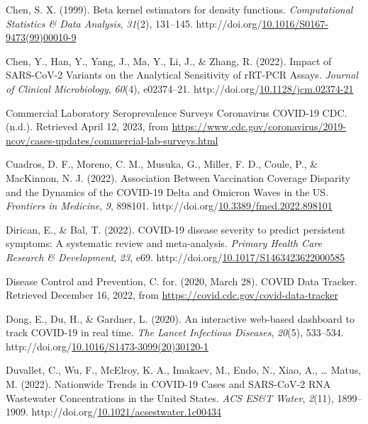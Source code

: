 \documentclass[12pt,twoside]{smiththesis}
\newlength{\cslhangindent}
\newenvironment{CSLReferences}[2] %
 {%
\setlength{\parindent}{0pt}
\ifodd #1 \everypar{\setlength{\hangindent}{\cslhangindent}}\ignorespaces\fi
\ifnum #2 > 0
\setlength{\parskip}{#2\baselineskip}
  \fi
}%
{}
\begin{document}
\begin{CSLReferences}{1}{0}
\leavevmode{}%
Chen, S. X. (1999). Beta kernel estimators for density functions. \emph{Computational Statistics \& Data Analysis}, \emph{31}(2), 131--145. http://doi.org/\href{https://doi.org/10.1016/S0167-9473(99)00010-9}{10.1016/S0167-9473(99)00010-9}

\leavevmode{}%
Chen, Y., Han, Y., Yang, J., Ma, Y., Li, J., \& Zhang, R. (2022). Impact of {SARS-CoV-2 Variants} on the {Analytical Sensitivity} of {rRT-PCR Assays}. \emph{Journal of Clinical Microbiology}, \emph{60}(4), e02374--21. http://doi.org/\href{https://doi.org/10.1128/jcm.02374-21}{10.1128/jcm.02374-21}

\leavevmode{}%
Commercial {Laboratory Seroprevalence Surveys} \textbar{} {Coronavirus} \textbar{} {COVID-19} \textbar{} {CDC}. (n.d.). Retrieved April 12, 2023, from \url{https://www.cdc.gov/coronavirus/2019-ncov/cases-updates/commercial-lab-surveys.html}

\leavevmode{}%
Cuadros, D. F., Moreno, C. M., Musuka, G., Miller, F. D., Coule, P., \& MacKinnon, N. J. (2022). Association {Between Vaccination Coverage Disparity} and the {Dynamics} of the {COVID-19 Delta} and {Omicron Waves} in the {US}. \emph{Frontiers in Medicine}, \emph{9}, 898101. http://doi.org/\href{https://doi.org/10.3389/fmed.2022.898101}{10.3389/fmed.2022.898101}

\leavevmode{}%
Dirican, E., \& Bal, T. (2022). {COVID-19} disease severity to predict persistent symptoms: A systematic review and meta-analysis. \emph{Primary Health Care Research \& Development}, \emph{23}, e69. http://doi.org/\href{https://doi.org/10.1017/S1463423622000585}{10.1017/S1463423622000585}

\leavevmode{}%
Disease Control and Prevention, C. for. (2020, March 28). {COVID Data Tracker}. Retrieved December 16, 2022, from \url{https://covid.cdc.gov/covid-data-tracker}

\leavevmode{}%
Dong, E., Du, H., \& Gardner, L. (2020). An interactive web-based dashboard to track {COVID-19} in real time. \emph{The Lancet Infectious Diseases}, \emph{20}(5), 533--534. http://doi.org/\href{https://doi.org/10.1016/S1473-3099(20)30120-1}{10.1016/S1473-3099(20)30120-1}

\leavevmode{}%
Duvallet, C., Wu, F., McElroy, K. A., Imakaev, M., Endo, N., Xiao, A., \ldots{} Matus, M. (2022). Nationwide {Trends} in {COVID-19 Cases} and {SARS-CoV-2 RNA Wastewater Concentrations} in the {United States}. \emph{ACS ES\&T Water}, \emph{2}(11), 1899--1909. http://doi.org/\href{https://doi.org/10.1021/acsestwater.1c00434}{10.1021/acsestwater.1c00434}


\end{CSLReferences}
\end{document}
